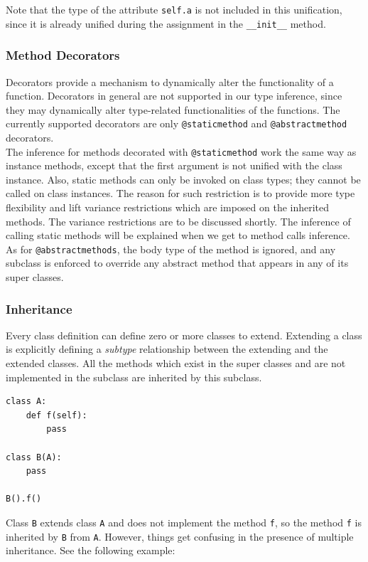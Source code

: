 Note that the type of the attribute \lstinline|self.a| is not included in this unification, since it is already unified during the assignment in the \lstinline|__init__| method.

\subsubsection{Method Decorators}
Decorators provide a mechanism to dynamically alter the functionality of a function. Decorators in general are not supported in our type inference, since they may dynamically alter type-related functionalities of the functions. The currently supported decorators are only \lstinline|@staticmethod| and \lstinline|@abstractmethod| decorators. \\

The inference for methods decorated with \lstinline|@staticmethod| work the same way as instance methods, except that the first argument is not unified with the class instance. Also, static methods can only be invoked on class types; they cannot be called on class instances. The reason for such restriction is to provide more type flexibility and lift variance restrictions which are imposed on the inherited methods. The variance restrictions are to be discussed shortly. The inference of calling static methods will be explained when we get to method calls inference. \\

As for \lstinline|@abstractmethods|, the body type of the method is ignored, and any subclass is enforced to override any abstract method that appears in any of its super classes.

\subsubsection{Inheritance}
Every class definition can define zero or more classes to extend. Extending a class is explicitly defining a \textit{subtype} relationship between the extending and the extended classes. All the methods which exist in the super classes and are not implemented in the subclass are inherited by this subclass.
\begin{lstlisting}
class A:
	def f(self):
		pass

class B(A):
	pass
	
B().f()
\end{lstlisting}

Class \lstinline|B| extends class \lstinline|A| and does not implement the method \lstinline|f|, so the method \lstinline|f| is inherited by \lstinline|B| from \lstinline|A|. However, things get confusing in the presence of multiple inheritance. See the following example:

